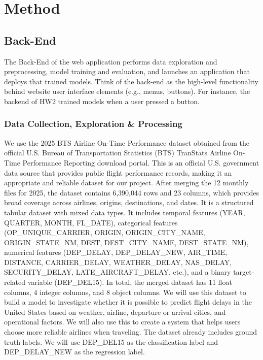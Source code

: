 \section{Method}

\subsection{Back-End}

The Back-End of the web application performs data exploration and preprocessing, model training and evaluation, and launches an application that deploys that trained models. Think of the back-end as the high-level functionality behind website user interface elements (e.g., menus, buttons). For instance, the backend of HW2 trained models when a user pressed a button.

\subsubsection{Data Collection, Exploration \& Processing} 

We use the 2025 BTS Airline On-Time Performance dataset obtained from the official U.S. Bureau of Transportation Statistics (BTS) TranStats Airline On-Time Performance Reporting download portal. This is an official U.S. government data source that provides public flight performance records, making it an appropriate and reliable dataset for our project. After merging the 12 monthly files for 2025, the dataset contains 6,390,044 rows and 23 columns, which provides broad coverage across airlines, origins, destinations, and dates. It is a structured tabular dataset with mixed data types. It includes temporal features (YEAR, QUARTER, MONTH, FL\_DATE), categorical features (OP\_UNIQUE\_CARRIER, ORIGIN, ORIGIN\_CITY\_NAME, ORIGIN\_STATE\_NM, DEST, DEST\_CITY\_NAME, DEST\_STATE\_NM), numerical features (DEP\_DELAY, DEP\_DELAY\_NEW, AIR\_TIME, DISTANCE, CARRIER\_DELAY, WEATHER\_DELAY, NAS\_DELAY, SECURITY\_DELAY, LATE\_AIRCRAFT\_DELAY, etc.), and a binary target-related variable (DEP\_DEL15). In total, the merged dataset has 11 float columns, 4 integer columns, and 8 object columns. We will use this dataset to build a model to investigate whether it is possible to predict flight delays in the United States based on weather, airline, departure or arrival cities, and operational factors. We will also use this to create a system that helps users choose more reliable airlines when traveling. The dataset already includes ground truth labels. We will use DEP\_DEL15 as the classification label and DEP\_DELAY\_NEW as the regression label.

